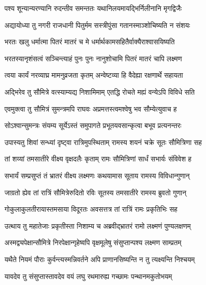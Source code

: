 \twolineshloka
{पश्य शून्यान्यरण्यानि रुदन्तीव समन्ततः}
{यथानिलयमायद्भिर्निलीनानि मृगद्विजैः} %

\twolineshloka
{अद्यायोध्या तु नगरी राजधानी पितुर्मम}
{सस्त्रीपुंसा गतानस्माञ्शोचिष्यति न संशयः} %

\twolineshloka
{भरतः खलु धर्मात्मा पितरं मातरं च मे}
{धर्मार्थकामसहितैर्वाक्यैराश्वासयिष्यति} %

\twolineshloka
{भरतस्यानृशंसत्वं सञ्चिन्त्याहं पुनः पुनः}
{नानुशोचामि पितरं मातरं चापि लक्ष्मण} %

\twolineshloka
{त्वया कार्यं नरव्याघ्र मामनुव्रजता कृतम्}
{अन्वेष्टव्या हि वैदेह्या रक्षणार्थे सहायता} %

\twolineshloka
{अद्भिरेव तु सौमित्रे वत्स्याम्यद्य निशामिमाम्}
{एतद्धि रोचते मह्यं वन्येऽपि विविधे सति} %

\twolineshloka
{एवमुक्त्वा तु सौमित्रं सुमन्त्रमपि राघवः}
{अप्रमत्तस्त्वमश्वेषु भव सौम्येत्युवाच ह} %

\twolineshloka
{सोऽश्वान्सुमन्त्रः संयम्य सूर्येऽस्तं समुपागते}
{प्रभूतयवसान्कृत्वा बभूव प्रत्यनन्तरः} %

\twolineshloka
{उपास्यतु शिवां सन्ध्यां दृष्ट्वा रात्रिमुपस्थिताम्}
{रामस्य शयनं चक्रे सूतः सौमित्रिणा सह} %

\twolineshloka
{तां शय्यां तमसातीरे वीक्ष्य वृक्षदलैः कृताम्}
{रामः सौमित्रिणां सार्धं सभार्यः संविवेश ह} %

\twolineshloka
{सभार्यं सम्प्रसुप्तं तं भ्रातरं वीक्ष्य लक्ष्मणः}
{कथयामास सूताय रामस्य विविधान्गुणान्} %

\twolineshloka
{जाग्रतो ह्येव तां रात्रिं सौमित्रेरुदितो रविः}
{सूतस्य तमसातीरे रामस्य ब्रुवतो गुणान्} %

\twolineshloka
{गोकुलाकुलतीरायास्तमसाया विदूरतः}
{अवसत्तत्र तां रात्रिं रामः प्रकृतिभिः सह} %

\twolineshloka
{उत्थाय तु महातेजाः प्रकृतीस्ता निशाम्य च}
{अब्रवीद्भ्रातरं रामो लक्ष्मणं पुण्यलक्षणम्} %

\twolineshloka
{अस्मद्व्यपेक्षान्सौमित्रे निरपेक्षान्गृहेष्वपि}
{वृक्षमूलेषु संसुप्तान्पश्य लक्ष्मण साम्प्रतम्} %

\twolineshloka
{यथैते नियमं पौराः कुर्वन्त्यस्मन्निवर्तने}
{अपि प्राणानसिष्यन्ति न तु त्यक्ष्यन्ति निश्चयम्} %

\twolineshloka
{यावदेव तु संसुप्तास्तावदेव वयं लघु}
{रथमारुह्य गच्छामः पन्थानमकुतोभयम्} %

